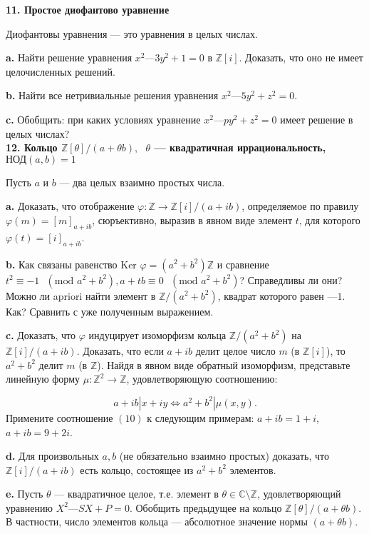 \documentclass{mai_book}
\begin{document}
\noindent \textbf{11. Простое диофантово уравнение}

Диофантовы уравнения — это уравнения в целых числах.

\textbf{a.} Найти решение уравнения $x^2 — 3 y^2 + 1 = 0$ в $\mathbb{Z}[i]$. Доказать, что оно не имеет целочисленных решений.

\textbf{b.} Найти все нетривиальные решения уравнения $x^2 — 5 y^2 + z^2 = 0$.

\textbf{c.} Обобщить: при каких условиях уравнение $x^2 —py^2 + z^2 = 0$ имеет решение в целых числах?
\\

\noindent \textbf{12. Кольцо $\mathbb{Z}[\theta] / (a + \theta b), \text{ } \theta$ — квадратичная иррациональность,} \\ $\text{НОД}(a,b) = 1$

Пусть $a$ и $b$ — два целых взаимно простых числа.

\textbf{a.} Доказать, что отображение $\varphi:\mathbb{Z}\to\mathbb{Z}[i]/(a+ib)$, определяемое по правилу $\varphi(m)=[m]_{a+ib}$, сюръективно, выразив в явном виде элемент $t$, для которого $\varphi(t)=[i]_{a+ib}$.

\textbf{b.} Как связаны равенство $\text{Ker }\varphi=(a^2+b^2)\mathbb{Z}$ и сравнение $t^2\equiv-1 \text{ } (\text{mod } a^2+b^2), a+tb\equiv0 \text{ } (\text{mod } a^2+b^2)$? Справедливы ли они? Можно ли
apriori найти элемент в $\mathbb{Z}/(a^2 + b^2)$, квадрат которого равен $—1$. Как? Сравнить с уже полученным выражением.

\textbf{c.} Доказать, что $\varphi$ индуцирует изоморфизм кольца $\mathbb{Z}/(a^2 + b^2)$ на $\mathbb{Z}[i]/(a+ib)$. Доказать, что если $a + ib$ делит целое число $m$ (в $\mathbb{Z}[i]$), то $a^2 + b^2$ делит $m$ (в $\mathbb{Z}$). Найдя в явном виде обратный изоморфизм, представьте линейную форму $\mu:\mathbb{Z}^2\to\mathbb{Z}$, удовлетворяющую соотношению:

\[
a+ib|x+iy\Longleftrightarrow a^2+b^2|\mu(x,y).
\]
Примените соотношение $(10)$ к следующим примерам: $a + ib = 1 + i$,
$a + ib = 9 + 2i$.

\textbf{d.} Для произвольных $a, b$ (не обязательно взаимно простых) 
доказать, что $\mathbb{Z}[i]/(a+ib)$ есть кольцо, состоящее из $a^2 + b^2$ элементов.

\textbf{e.} Пусть $\theta$ — квадратичное целое, т.е. элемент в $\theta \in \mathbb{C}\setminus\mathbb{Z}$, удовлетворяющий уравнению $X^2 — SX + P = 0$. Обобщить предыдущее на кольцо $\mathbb{Z}[\theta] / (a + \theta b)$. В частности, число элементов кольца — абсолютное значение нормы $(a + \theta b)$.
\\
\end{document}
